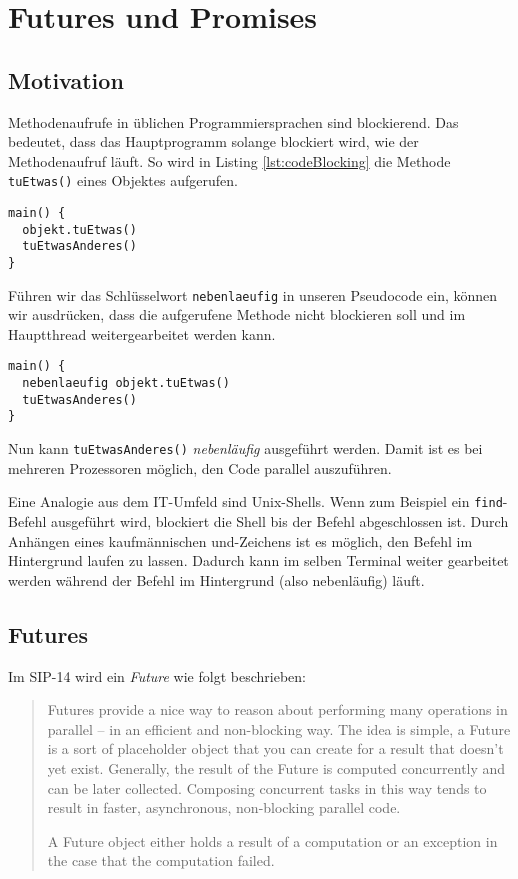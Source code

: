 \section{Futures und Promises}

\subsection{Motivation}

Methodenaufrufe in üblichen Programmiersprachen sind blockierend. Das bedeutet,
dass das Hauptprogramm solange blockiert wird, wie der Methodenaufruf läuft.
So wird in Listing \ref{lst:codeBlocking} die Methode \texttt{tuEtwas()} eines Objektes aufgerufen.

\begin{lstlisting}[caption={Blockierender Methodenaufruf},label={lst:codeBlocking},captionpos=b]
main() {
  objekt.tuEtwas()
  tuEtwasAnderes()
}
\end{lstlisting}

Führen wir das Schlüsselwort \texttt{nebenlaeufig} in unseren Pseudocode ein,
können wir ausdrücken, dass die aufgerufene Methode nicht blockieren soll
und im Hauptthread weitergearbeitet werden kann.

\begin{lstlisting}[caption={Nebenläufiger Methodenaufruf},label={lst:codeConcurrent},captionpos=b]
main() {
  nebenlaeufig objekt.tuEtwas()
  tuEtwasAnderes()
}
\end{lstlisting}

Nun kann \texttt{tuEtwasAnderes()} \emph{nebenläufig} ausgeführt werden. Damit
ist es bei mehreren Prozessoren möglich, den Code parallel auszuführen.

Eine Analogie aus dem IT-Umfeld sind Unix-Shells. Wenn zum Beispiel ein
\texttt{find}-Befehl ausgeführt wird, blockiert die Shell bis der Befehl
abgeschlossen ist. Durch Anhängen eines kaufmännischen \glqq und\grqq{}-Zeichens 
ist es möglich,
den Befehl im Hintergrund laufen zu lassen. Dadurch kann im selben
Terminal weiter gearbeitet werden während der Befehl im Hintergrund (also nebenläufig)
läuft.

\subsection{Futures}

Im SIP-14 wird ein \emph{Future} wie folgt beschrieben:
\begin{quote}
Futures provide a nice way to reason about performing many operations in 
parallel – in an efficient and non-blocking way. The idea is simple, a Future 
is a sort of placeholder object that you can create for a result that doesn’t 
yet exist. Generally, the result of the Future is computed concurrently and can 
be later collected. Composing concurrent tasks in this way tends to result in 
faster, asynchronous, non-blocking parallel code.

A Future object either holds a result of a computation or an 
exception in the case that the computation failed.
\end{quote}

